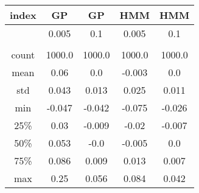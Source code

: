 \centering \begin{tabular}{c|c|c|c|c}
index	&GP	&GP	&HMM	&HMM\\\hline
	&0.005	&0.1	&0.005	&0.1\\
	&	&	&	&\\
count	&1000.0	&1000.0	&1000.0	&1000.0\\
mean	&0.06	&0.0	&-0.003	&0.0\\
std	&0.043	&0.013	&0.025	&0.011\\
min	&-0.047	&-0.042	&-0.075	&-0.026\\
25\%	&0.03	&-0.009	&-0.02	&-0.007\\
50\%	&0.053	&-0.0	&-0.005	&0.0\\
75\%	&0.086	&0.009	&0.013	&0.007\\
max	&0.25	&0.056	&0.084	&0.042\\
\end{tabular}
